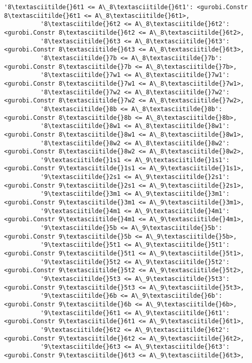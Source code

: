 \documentclass[11pt]{article}
\begin{document}
\begin{Verbatim}[commandchars=\\\{\}]
          '8\textasciitilde{}6t1 <= A\_8\textasciitilde{}6t1': <gurobi.Constr 8\textasciitilde{}6t1 <= A\_8\textasciitilde{}6t1>,
          '8\textasciitilde{}6t2 <= A\_8\textasciitilde{}6t2': <gurobi.Constr 8\textasciitilde{}6t2 <= A\_8\textasciitilde{}6t2>,
          '8\textasciitilde{}6t3 <= A\_8\textasciitilde{}6t3': <gurobi.Constr 8\textasciitilde{}6t3 <= A\_8\textasciitilde{}6t3>,
          '8\textasciitilde{}7b <= A\_8\textasciitilde{}7b': <gurobi.Constr 8\textasciitilde{}7b <= A\_8\textasciitilde{}7b>,
          '8\textasciitilde{}7w1 <= A\_8\textasciitilde{}7w1': <gurobi.Constr 8\textasciitilde{}7w1 <= A\_8\textasciitilde{}7w1>,
          '8\textasciitilde{}7w2 <= A\_8\textasciitilde{}7w2': <gurobi.Constr 8\textasciitilde{}7w2 <= A\_8\textasciitilde{}7w2>,
          '8\textasciitilde{}8b <= A\_8\textasciitilde{}8b': <gurobi.Constr 8\textasciitilde{}8b <= A\_8\textasciitilde{}8b>,
          '8\textasciitilde{}8w1 <= A\_8\textasciitilde{}8w1': <gurobi.Constr 8\textasciitilde{}8w1 <= A\_8\textasciitilde{}8w1>,
          '8\textasciitilde{}8w2 <= A\_8\textasciitilde{}8w2': <gurobi.Constr 8\textasciitilde{}8w2 <= A\_8\textasciitilde{}8w2>,
          '9\textasciitilde{}1s1 <= A\_9\textasciitilde{}1s1': <gurobi.Constr 9\textasciitilde{}1s1 <= A\_9\textasciitilde{}1s1>,
          '9\textasciitilde{}2s1 <= A\_9\textasciitilde{}2s1': <gurobi.Constr 9\textasciitilde{}2s1 <= A\_9\textasciitilde{}2s1>,
          '9\textasciitilde{}3m1 <= A\_9\textasciitilde{}3m1': <gurobi.Constr 9\textasciitilde{}3m1 <= A\_9\textasciitilde{}3m1>,
          '9\textasciitilde{}4m1 <= A\_9\textasciitilde{}4m1': <gurobi.Constr 9\textasciitilde{}4m1 <= A\_9\textasciitilde{}4m1>,
          '9\textasciitilde{}5b <= A\_9\textasciitilde{}5b': <gurobi.Constr 9\textasciitilde{}5b <= A\_9\textasciitilde{}5b>,
          '9\textasciitilde{}5t1 <= A\_9\textasciitilde{}5t1': <gurobi.Constr 9\textasciitilde{}5t1 <= A\_9\textasciitilde{}5t1>,
          '9\textasciitilde{}5t2 <= A\_9\textasciitilde{}5t2': <gurobi.Constr 9\textasciitilde{}5t2 <= A\_9\textasciitilde{}5t2>,
          '9\textasciitilde{}5t3 <= A\_9\textasciitilde{}5t3': <gurobi.Constr 9\textasciitilde{}5t3 <= A\_9\textasciitilde{}5t3>,
          '9\textasciitilde{}6b <= A\_9\textasciitilde{}6b': <gurobi.Constr 9\textasciitilde{}6b <= A\_9\textasciitilde{}6b>,
          '9\textasciitilde{}6t1 <= A\_9\textasciitilde{}6t1': <gurobi.Constr 9\textasciitilde{}6t1 <= A\_9\textasciitilde{}6t1>,
          '9\textasciitilde{}6t2 <= A\_9\textasciitilde{}6t2': <gurobi.Constr 9\textasciitilde{}6t2 <= A\_9\textasciitilde{}6t2>,
          '9\textasciitilde{}6t3 <= A\_9\textasciitilde{}6t3': <gurobi.Constr 9\textasciitilde{}6t3 <= A\_9\textasciitilde{}6t3>,

\end{Verbatim}
\end{document}
